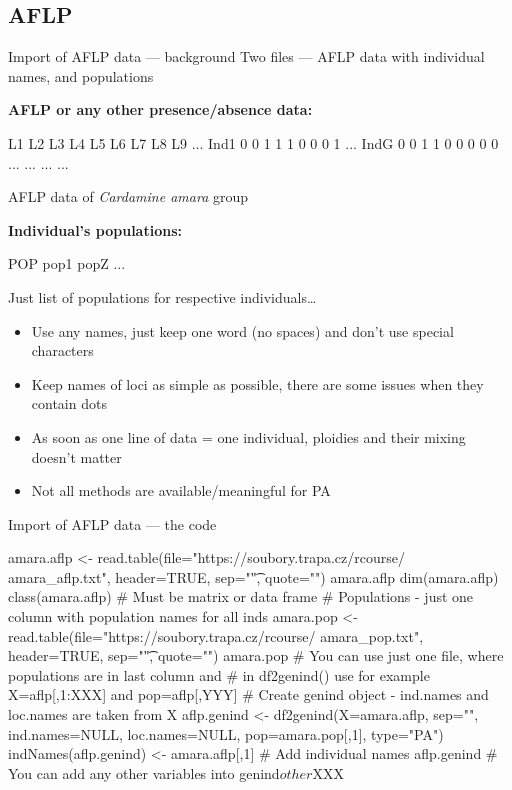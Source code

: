 \documentclass[compress, ucs, xelatex, 11pt, xcolor=svgnames, aspectratio=169,
	hyperref={
		bookmarks=true,
		unicode=true,
		colorlinks=true,
		pdftitle={Molecular data in R},
		plainpages=false,
		pdfauthor={Vojtech Zeisek},
		pdfsubject={Course about phylogeny and evolution in R},
		pdfcreator={XeLaTeX},
		pdfkeywords={R, evolution, phylogeny, molecular data},
		linkcolor=Crimson, %
		anchorcolor=Magenta, %
		citecolor=Magenta, %
		filecolor=Magenta, %
		menucolor=Magenta, %
		urlcolor=DodgerBlue, %
		pdftex},
	url={hyphens, lowtilde} %
	]{beamer}
\begin{document}
\subsection{AFLP}

\begin{frame}[fragile]{Import of AFLP data --- background}
	Two files --- AFLP data with individual names, and populations
	\vfill
	\begin{multicols}{2}
	\vfill
	\textbf{AFLP or any other presence/absence data:}
	\vfill
	\begin{spluscode}
        L1 L2 L3 L4 L5 L6 L7 L8 L9 ...
    Ind1 0  0  1  1  1  0  0  0  1 ...
    IndG 0  0  1  1  0  0  0  0  0 ...
     ...  ...                      ...
	\end{spluscode}
	\vfill
	\begin{footnotesize}
		AFLP data of \textit{Cardamine amara} group
	\end{footnotesize}
	\vfill
	\textbf{Individual's populations:}
	\vfill
	\begin{spluscode}
    POP
    pop1
    popZ
    ...
	\end{spluscode}
	\vfill
	\begin{footnotesize}
		Just list of populations for respective individuals\ldots
	\end{footnotesize}
	\columnbreak
	\begin{itemize}
		\item Use any names, just keep one word (no spaces) and don't use special characters
		\item Keep names of loci as simple as possible, there are some issues when they contain dots
		\item As soon as one line of data = one individual, ploidies and their mixing doesn't matter
		\item Not all methods are available/meaningful for PA
	\end{itemize}
	\end{multicols}
\end{frame}

\begin{frame}[fragile]{Import of AFLP data --- the code}
	\begin{spluscode}
    amara.aflp <- read.table(file="https://soubory.trapa.cz/rcourse/
      amara_aflp.txt", header=TRUE, sep="\t", quote="")
    amara.aflp
    dim(amara.aflp)
    class(amara.aflp) # Must be matrix or data frame
    # Populations - just one column with population names for all inds
    amara.pop <- read.table(file="https://soubory.trapa.cz/rcourse/
      amara_pop.txt", header=TRUE, sep="\t", quote="")
    amara.pop
    # You can use just one file, where populations are in last column and
    # in df2genind() use for example X=aflp[,1:XXX] and pop=aflp[,YYY]
    # Create genind object - ind.names and loc.names are taken from X
    aflp.genind <- df2genind(X=amara.aflp, sep="", ind.names=NULL,
      loc.names=NULL, pop=amara.pop[,1], type="PA")
    indNames(aflp.genind) <- amara.aflp[,1] # Add individual names
    aflp.genind
    # You can add any other variables into genind$other$XXX
	\end{spluscode}
\end{frame}
\end{document}
